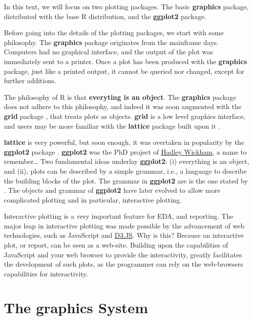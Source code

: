 \documentclass[]{book}
\theoremstyle{definition}
\theoremstyle{definition}
\theoremstyle{definition}
\theoremstyle{remark}
\begin{document}
In this text, we will focus on two plotting packages. The basic
\textbf{graphics} package, distributed with the base R distribution, and
the \textbf{ggplot2} package.

Before going into the details of the plotting packages, we start with
some philosophy. The \textbf{graphics} package originates from the
mainframe days. Computers had no graphical interface, and the output of
the plot was immediately sent to a printer. Once a plot has been
produced with the \textbf{graphics} package, just like a printed output,
it cannot be queried nor changed, except for further additions.

The philosophy of R is that \textbf{everyting is an object}. The
\textbf{graphics} package does not adhere to this philosophy, and indeed
it was soon augmented with the \textbf{grid} package \citep{Rlanguage},
that treats plots as objects. \textbf{grid} is a low level graphics
interface, and users may be more familiar with the \textbf{lattice}
package built upon it \citep{lattice}.

\textbf{lattice} is very powerful, but soon enough, it was overtaken in
popularity by the \textbf{ggplot2} package \citep{ggplot2}.
\textbf{ggplot2} was the PhD project of \href{http://hadley.nz/}{Hadley
Wickham}, a name to remember\ldots{} Two fundamental ideas underlay
\textbf{ggplot2}: (i) everything is an object, and (ii), plots can be
described by a simple grammar, i.e., a language to describe the building
blocks of the plot. The grammar in \textbf{ggplot2} are is the one
stated by \citet{wilkinson2006grammar}. The objects and grammar of
\textbf{ggplot2} have later evolved to allow more complicated plotting
and in particular, interactive plotting.

Interactive plotting is a very important feature for EDA, and reporting.
The major leap in interactive plotting was made possible by the
advancement of web technologies, such as JavaScript and
\href{https://en.wikipedia.org/wiki/D3.js}{D3.JS}. Why is this? Because
an interactive plot, or report, can be seen as a web-site. Building upon
the capabilities of JavaScript and your web browser to provide the
interactivity, greatly facilitates the development of such plots, as the
programmer can rely on the web-browsers capabilities for interactivity.

\section{The graphics System}\label{the-graphics-system}
\end{document}
